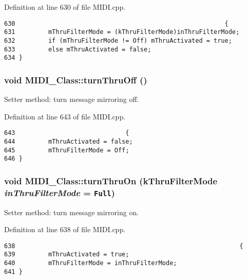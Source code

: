Definition at line 630 of file MIDI.cpp.

\begin{Code}\begin{verbatim}630                                                         { 
631         mThruFilterMode = (kThruFilterMode)inThruFilterMode;
632         if (mThruFilterMode != Off) mThruActivated = true;
633         else mThruActivated = false;
634 }
\end{verbatim}
\end{Code}


\hypertarget{class_m_i_d_i___class_c1999ba222737523008d6f1c579d6816}{
\subsubsection[{turnThruOff}]{\setlength{\rightskip}{0pt plus 5cm}void MIDI\_\-Class::turnThruOff ()}}
\label{class_m_i_d_i___class_c1999ba222737523008d6f1c579d6816}


Setter method: turn message mirroring off. 

Definition at line 643 of file MIDI.cpp.

\begin{Code}\begin{verbatim}643                              {
644         mThruActivated = false; 
645         mThruFilterMode = Off;
646 }
\end{verbatim}
\end{Code}


\hypertarget{class_m_i_d_i___class_7fd1759eda22c18f6122b4231e1f0a6d}{
\subsubsection[{turnThruOn}]{\setlength{\rightskip}{0pt plus 5cm}void MIDI\_\-Class::turnThruOn ({\bf kThruFilterMode} {\em inThruFilterMode} = {\tt Full})}}
\label{class_m_i_d_i___class_7fd1759eda22c18f6122b4231e1f0a6d}


Setter method: turn message mirroring on. 

Definition at line 638 of file MIDI.cpp.

\begin{Code}\begin{verbatim}638                                                             { 
639         mThruActivated = true;
640         mThruFilterMode = inThruFilterMode;
641 }
\end{verbatim}
\end{Code}




